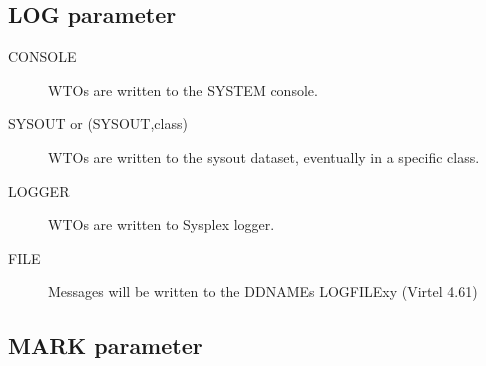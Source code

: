 \documentclass[letterpaper,10pt,english]{sphinxmanual}
\begin{document}
\ignorespaces 

\subsection{LOG parameter}
\label{\detokenize{Installation_Guide:log-parameter}}\label{\detokenize{Installation_Guide:index-87}}
\begin{sphinxVerbatim}[commandchars=\\\{\}]
                    
\end{sphinxVerbatim}
\begin{description}
\item[{CONSOLE}] \leavevmode
WTOs are written to the SYSTEM console.

\item[{SYSOUT or (SYSOUT,class)}] \leavevmode
WTOs are written to the sysout dataset, eventually in a specific class.

\item[{LOGGER}] \leavevmode
WTOs are written to Sysplex logger.

\item[{FILE}] \leavevmode
Messages will be written to the DDNAMEs LOGFILEx\textbar{}y               (Virtel 4.61)

\end{description}

\ignorespaces 

\subsection{MARK parameter}
\label{\detokenize{Installation_Guide:mark-parameter}}\label{\detokenize{Installation_Guide:index-88}}
\begin{sphinxVerbatim}[commandchars=\\\{\}]
                              
\end{sphinxVerbatim}
\end{document}
